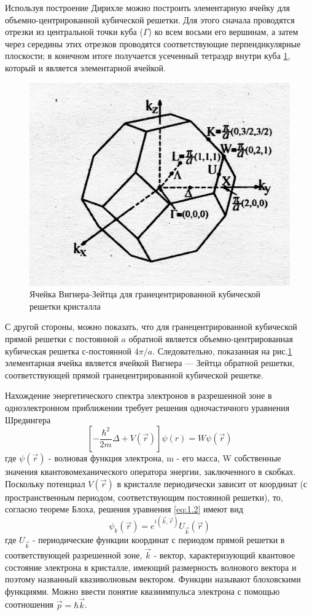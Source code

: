 Используя построение Дирихле можно построить элементарную ячейку для объемно-центрированной кубической решетки. Для
этого сначала проводятся отрезки из центральной точки куба ($\Gamma$) ко всем восьми его вершинам, а затем через середины этих
отрезков проводятся соответствующие перпендикулярные плоскости; в конечном итоге получается усеченный тетраэдр внутри
куба \ref{fig:1.4}, который и является элементарной ячейкой.
\begin{figure}[h!]
	\centering
	\includegraphics[width = .8\linewidth]{img/14.jpg}
	\caption{Ячейка Вигнера-Зейтца для гранецентрированной кубической решетки кристалла}
	\label{fig:1.4}
\end{figure}
С другой стороны, можно показать, что для гранецентрированной кубической прямой решетки с постоянной $a$ обратной является
объемно-центрированная кубическая решетка с-постоянной $4 \pi /a$. Следовательно, показанная на рис.\ref{fig:1.4} элементарная ячейка
является ячейкой Вигнера — Зейтца обратной решетки, соответствующей прямой гранецентрированной кубической решетке.

Нахождение энергетического спектра электронов в разрешенной зоне в одноэлектронном приближении требует решения одночастичного уравнения Шредингера
\begin{equation}
	\left[-\frac{\hbar^{2}}{2 m} \Delta+V(\vec{r})\right] \psi(r)=W \psi(\vec{r})
	\label{eq:1.4}
\end{equation}
где $\psi(\vec{r})$ - волновая функция электрона, m - его масса, W собственные значения квантовомеханического оператора
энергии, заключенного в скобках. Поскольку потенциал $V(\vec{r})$ в кристалле периодически зависит от координат (с
пространственным периодом, соответствующим постоянной решетки), то, согласно теореме Блоха, решения уравнения
\eqref{eq:1.2} имеют вид
\begin{equation}
	\psi_{k}(\vec{r})=e^{i(\vec{k}, \vec{r})} U_{\vec{k}}(\vec{r})
	\label{eq:1.5}
\end{equation}
где $ U_{\vec{k}}$ - периодические функции координат с периодом прямой решетки в соответствующей разрешенной зоне,
$\vec{k}$ - вектор, характеризующий квантовое состояние электрона в кристалле, имеющий размерность волнового вектора и
поэтому названный квазиволновым вектором. Функции называют блоховскими функциями. Можно ввести понятие квазиимпульса
электрона с помощью соотношения $\vec{p}=\hbar \vec{k}$.

